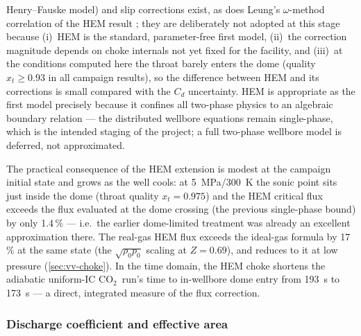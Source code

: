 \documentclass[11pt]{article}
\newcommand{\co}{CO$_2$}
\begin{document}
Henry--Fauske model) and slip corrections exist, as does Leung's
$\omega$-method correlation of the HEM result \citep{leung1986}; they
are deliberately not adopted at this stage because (i)~HEM is the
standard, parameter-free first model, (ii)~the correction magnitude
depends on choke internals not yet fixed for the facility, and
(iii)~at the conditions computed here the throat barely enters the
dome (quality $x_t \ge 0.93$ in all campaign results), so the
difference between HEM and its corrections is small compared with the
$C_d$ uncertainty. HEM is appropriate as the first model precisely
because it confines all two-phase physics to an algebraic boundary
relation --- the distributed wellbore equations remain single-phase,
which is the intended staging of the project; a full two-phase
wellbore model is deferred, not approximated.

The practical consequence of the HEM extension is modest at the
campaign initial state and grows as the well cools: at
\SI{5}{MPa}/\SI{300}{K} the sonic point sits just inside the dome
(throat quality $x_t = 0.975$) and the HEM critical flux exceeds the
flux evaluated at the dome crossing (the previous single-phase bound)
by only 1.4\,\% --- i.e.\ the earlier dome-limited treatment was
already an excellent approximation there. The real-gas HEM flux
exceeds the ideal-gas formula by 17\,\% at the same state (the
$\sqrt{\rho_0 p_0}$ scaling at $Z = 0.69$), and reduces to it at low
pressure (\cref{sec:vv-choke}). In the time domain, the HEM choke
shortens the adiabatic uniform-IC \co\ run's time to in-wellbore dome
entry from \SI{193}{s} to \SI{173}{s} --- a direct, integrated measure
of the flux correction.

\subsubsection{Discharge coefficient and effective area}
\label{sec:cd}
\end{document}
